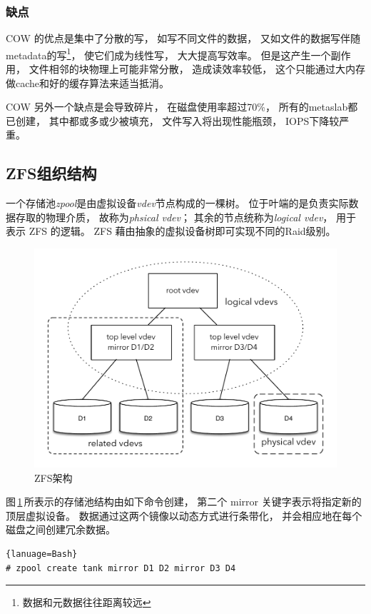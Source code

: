 \subsubsection{缺点}
COW 的优点是集中了分散的写，
如写不同文件的数据，
又如文件的数据写伴随metadata的写\footnote{数据和元数据往往距离较远}，
使它们成为线性写，
大大提高写效率。
但是这产生一个副作用，
文件相邻的块物理上可能非常分散，
造成读效率较低，
这个只能通过大内存做cache和好的缓存算法来适当抵消。

COW 另外一个缺点是会导致碎片，
在磁盘使用率超过70\%，
所有的metaslab都已创建，
其中都或多或少被填充，
文件写入将出现性能瓶颈，
IOPS下降较严重。

\subsection{ZFS组织结构}
一个存储池{\em zpool}是由虚拟设备{\em vdev}节点构成的一棵树。
位于叶端的是负责实际数据存取的物理介质，
故称为{\em phsical vdev}；
其余的节点统称为{\em logical vdev}，
用于表示 ZFS 的逻辑。
ZFS 藉由抽象的虚拟设备树即可实现不同的Raid级别。

\begin{figure}[ht]
  \centering
  \includegraphics[width=\textwidth]{fig/zfs_architecture.pdf}
  \caption{ZFS架构}\label{fig:arch}
\end{figure}

图\,\ref{fig:arch}\,所表示的存储池结构由如下命令创建，
第二个 mirror 关键字表示将指定新的顶层虚拟设备。
数据通过这两个镜像以动态方式进行条带化，
并会相应地在每个磁盘之间创建冗余数据。
\begin{lstlisting}{lanuage=Bash}
# zpool create tank mirror D1 D2 mirror D3 D4
\end{lstlisting}

